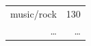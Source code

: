 \documentclass[xcolor=x11names,compress]{beamer}
\begin{document}
{\begin{columns}
\begin{table}[ht]
\begin{tabular}{rr}
                music/rock &  130 \\
                \ldots & \ldots \\

\end{tabular}
\end{table}
\end{columns}}
\end{document}

